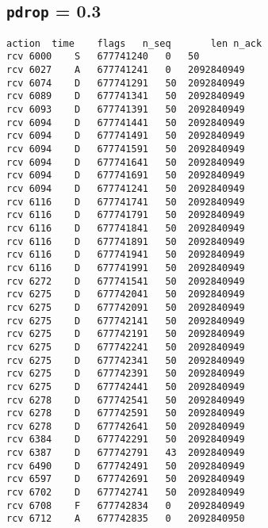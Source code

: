 \documentclass[a4paper]{article}
\begin{document}
\subsection {\texttt{pdrop} = 0.3}
\begin{lstlisting}
action	time	flags	n_seq		len	n_ack
rcv	6000	S	677741240	0	50
rcv	6027	A	677741241	0	2092840949
rcv	6074	D	677741291	50	2092840949
rcv	6089	D	677741341	50	2092840949
rcv	6093	D	677741391	50	2092840949
rcv	6094	D	677741441	50	2092840949
rcv	6094	D	677741491	50	2092840949
rcv	6094	D	677741591	50	2092840949
rcv	6094	D	677741641	50	2092840949
rcv	6094	D	677741691	50	2092840949
rcv	6094	D	677741241	50	2092840949
rcv	6116	D	677741741	50	2092840949
rcv	6116	D	677741791	50	2092840949
rcv	6116	D	677741841	50	2092840949
rcv	6116	D	677741891	50	2092840949
rcv	6116	D	677741941	50	2092840949
rcv	6116	D	677741991	50	2092840949
rcv	6272	D	677741541	50	2092840949
rcv	6275	D	677742041	50	2092840949
rcv	6275	D	677742091	50	2092840949
rcv	6275	D	677742141	50	2092840949
rcv	6275	D	677742191	50	2092840949
rcv	6275	D	677742241	50	2092840949
rcv	6275	D	677742341	50	2092840949
rcv	6275	D	677742391	50	2092840949
rcv	6275	D	677742441	50	2092840949
rcv	6278	D	677742541	50	2092840949
rcv	6278	D	677742591	50	2092840949
rcv	6278	D	677742641	50	2092840949
rcv	6384	D	677742291	50	2092840949
rcv	6387	D	677742791	43	2092840949
rcv	6490	D	677742491	50	2092840949
rcv	6597	D	677742691	50	2092840949
rcv	6702	D	677742741	50	2092840949
rcv	6708	F	677742834	0	2092840949
rcv	6712	A	677742835	0	2092840950
\end{lstlisting}
\end{document}
